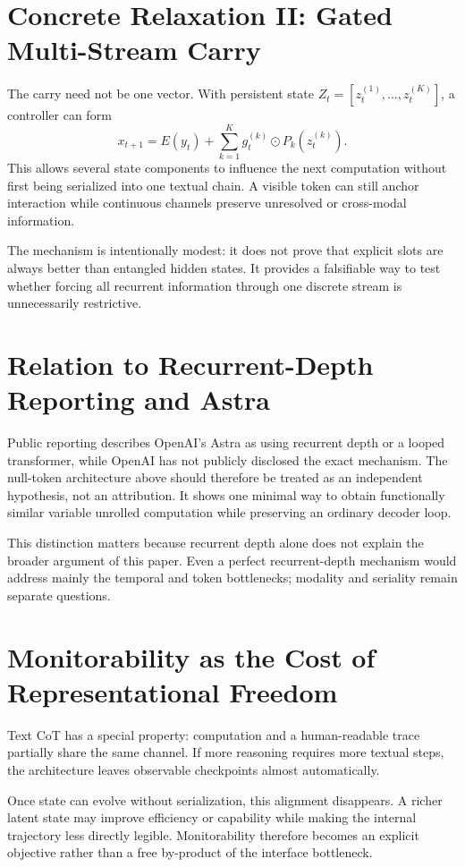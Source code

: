 \documentclass[10pt,twocolumn]{article}
\begin{document}
\section{Concrete Relaxation II: Gated Multi-Stream Carry}
The carry need not be one vector. With persistent state $Z_t=[z_t^{(1)},\ldots,z_t^{(K)}]$, a controller can form
\begin{equation}
 x_{t+1}=E(y_t)+\sum_{k=1}^{K}g_t^{(k)}\odot P_k(z_t^{(k)}).
 \label{eq:multi}
\end{equation}
This allows several state components to influence the next computation without first being serialized into one textual chain. A visible token can still anchor interaction while continuous channels preserve unresolved or cross-modal information.

The mechanism is intentionally modest: it does not prove that explicit slots are always better than entangled hidden states. It provides a falsifiable way to test whether forcing all recurrent information through one discrete stream is unnecessarily restrictive.

\section{Relation to Recurrent-Depth Reporting and Astra}
Public reporting describes OpenAI's Astra as using recurrent depth or a looped transformer, while OpenAI has not publicly disclosed the exact mechanism. The null-token architecture above should therefore be treated as an independent hypothesis, not an attribution. It shows one minimal way to obtain functionally similar variable unrolled computation while preserving an ordinary decoder loop.

This distinction matters because recurrent depth alone does not explain the broader argument of this paper. Even a perfect recurrent-depth mechanism would address mainly the temporal and token bottlenecks; modality and seriality remain separate questions.

\section{Monitorability as the Cost of Representational Freedom}
Text CoT has a special property: computation and a human-readable trace partially share the same channel. If more reasoning requires more textual steps, the architecture leaves observable checkpoints almost automatically.

Once state can evolve without serialization, this alignment disappears. A richer latent state may improve efficiency or capability while making the internal trajectory less directly legible. Monitorability therefore becomes an explicit objective rather than a free by-product of the interface bottleneck.
\end{document}
